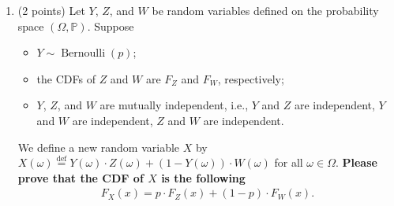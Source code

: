 \documentclass[11pt]{article}
\newcommand{\1}{\mathbbm{1}}
\newcommand{\p}{\mathbb{P}}
\begin{document}
\begin{enumerate}
\begin{figure}
    \caption{The CDF of the distribution of $X$ defined in Eq.~\eqref{eq: example whose dist is neither conti nor disc}. This function is neither continuous nor piecewise constant/step-like.}
    \label{fig: example whose dist is neither conti nor disc}
\end{figure}

\textbf{Please prove the formula in Eq.~\eqref{eq: a fair mixture of 1 and N(0,1)}.}

\begin{proof}
    By the law of total probability, 
    \[F_X(x)=\p(X\leq x)=\p(X\leq x\mid Y=1)\cdot \p(Y=1)+\p(X\leq x\mid Y=0)\cdot \p(Y=0)\]
    We will now compute each half of the sum.
    \begin{align*}
        \p(X\leq x\mid Y=1)\cdot \p(Y=1) &= \p(Y+(1-Y)Z\leq x\mid Y=1)\cdot \p(Y=1)\\
        &= \p(1+(1-1)Z\leq x)\cdot \p(Y=1)\\
        &= \p(1\leq x)\cdot \p(Y=1)\\
        &= \frac{1}{2}\1_{[1,+\infty)}(x)
    \end{align*}
    \begin{align*}
        \p(X\leq x\mid Y=0)\cdot \p(Y=0) &= \p(Y+(1-Y)Z\leq x\mid Y=0)\cdot \p(Y=0)\\
        &= \p(0+(1-0)Z\leq x)\cdot \p(Y=0)\\
        &= \p(Z\leq x)\cdot \p(Y=0)\\
        &= \frac{1}{2}F_Z(x)
    \end{align*}
    Therefore, \(F_X(x)=\frac{1}{2}\1_{[1,+\infty)}(x)+\frac{1}{2}F_Z(x)\).
\end{proof}

\item (2 points) Let $Y$, $Z$, and $W$ be random variables defined on the probability space $(\Omega,\mathbb{P})$. Suppose
    \begin{itemize}
        \item $Y\sim\operatorname{Bernoulli}(p)$;
        \item the CDFs of $Z$ and $W$ are $F_Z$ and $F_W$, respectively;
        \item $Y$, $Z$, and $W$ are mutually independent, i.e., $Y$ and $Z$ are independent, $Y$ and $W$ are independent, $Z$ and $W$ are independent.
    \end{itemize} 
    We define a new random variable $X$ by $X(\omega)\overset{\operatorname{def}}{=} Y(\omega)\cdot Z(\omega) + (1-Y(\omega))\cdot W(\omega)$ for all $\omega\in\Omega$. \textbf{Please prove that the CDF of $X$ is the following}
    \begin{align*}
        F_X(x) = p\cdot F_Z(x)+(1-p)\cdot F_W(x).
    \end{align*}



\end{enumerate}
\end{document}
